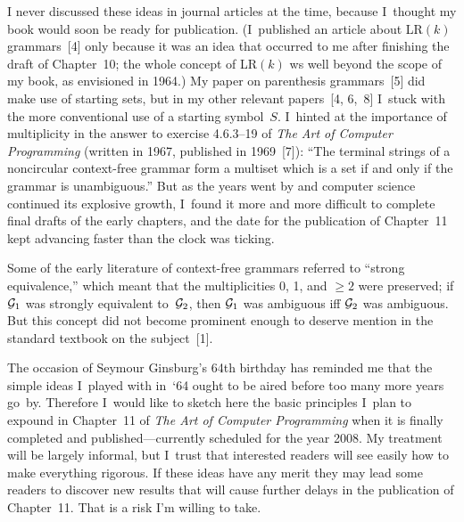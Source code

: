 I never discussed these ideas in journal articles at the time, because
I~thought my book would soon be ready for publication. (I~published an
article about LR$(k)$ grammars~[4]
only because it was an idea that occurred to me after finishing the
draft of Chapter~10; the whole concept of LR$(k)$ ws well beyond the
scope of my book, as envisioned in 1964.) My paper on parenthesis
grammars~[5]
did make use of starting sets, but in my other relevant papers~[4, 6,~8]
I~stuck with the more conventional use of a starting symbol~$S$.
I~hinted at the importance of multiplicity in the answer to exercise
4.6.3--19 of {\sl The Art of Computer Programming\/} (written in 1967,
published in 1969~[7]):
``The terminal strings of a noncircular context-free grammar form a
multiset which is a set if and only if the grammar is unambiguous.''
But as the years went by and computer science continued its explosive
growth, I~found it more and more difficult to complete final drafts
of the early chapters, and the date for the publication of Chapter~11
kept advancing faster than the clock was ticking.

Some of the early literature of context-free grammars referred to
``strong equivalence,'' which meant that the multiplicities 
0, 1, and $\geq 2$
were preserved; if ${\cal G}_1$
was strongly equivalent to~${\cal G}_2$, then ${\cal G}_1$ was
ambiguous iff ${\cal G}_2$ was ambiguous. But this concept did not
become prominent enough to deserve mention in the standard textbook on
the subject~[1].

The occasion of Seymour Ginsburg's 64th birthday has reminded me that
the simple ideas I~played with in~`64 ought to be aired before too
many more years go~by. Therefore I~would like to sketch here the basic
principles I~plan to expound in Chapter~11 of {\sl The Art of Computer
Programming\/} when it is finally completed and published---currently
scheduled for the year 2008. My treatment will be largely informal,
but I~trust that interested readers will see easily how to make
everything rigorous. If these ideas have any merit they may lead some
readers to discover new results that will cause further delays in the
publication of Chapter~11. That is a risk I'm willing to take.


